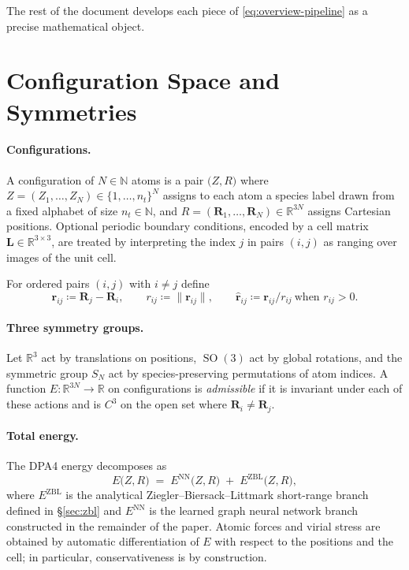 \documentclass[11pt,a4paper]{article}
\DeclareMathOperator{\SO}{SO}
\newcommand{\R}{\mathbb{R}}
\newcommand{\N}{\mathbb{N}}
\newcommand{\bR}{\bm{R}}
\newcommand{\br}{\bm{r}}
\newcommand{\brh}{\hat{\bm{r}}}
\theoremstyle{plain}
\theoremstyle{definition}
\theoremstyle{remark}
\begin{document}
The rest of the document develops each piece of \eqref{eq:overview-pipeline} as
a precise mathematical object.

\section{Configuration Space and Symmetries}\label{sec:setup}

\paragraph{Configurations.}
A configuration of $N\in\N$ atoms is a pair $\bigl(Z,R\bigr)$ where
$Z=(Z_1,\dots,Z_N)\in\{1,\dots,n_t\}^N$ assigns to each atom a species label
drawn from a fixed alphabet of size $n_t\in\N$, and
$R=(\bR_1,\dots,\bR_N)\in\R^{3N}$ assigns Cartesian positions. Optional
periodic boundary conditions, encoded by a cell matrix $\bm{L}\in\R^{3\times
        3}$, are treated by interpreting the index $j$ in pairs $(i,j)$ as ranging over
images of the unit cell.

For ordered pairs $(i,j)$ with $i\neq j$ define
\begin{equation}
    \br_{ij}\coloneqq \bR_j-\bR_i,\qquad
    r_{ij}\coloneqq \|\br_{ij}\|,\qquad
    \brh_{ij}\coloneqq \br_{ij}/r_{ij}\ \text{when }r_{ij}>0.
\end{equation}

\paragraph{Three symmetry groups.}
Let $\R^3$ act by translations on positions, $\SO(3)$ act by global rotations,
and the symmetric group $S_N$ act by species-preserving permutations of atom
indices. A function $E:\R^{3N}\to\R$ on configurations is \emph{admissible} if
it is invariant under each of these actions and is $C^3$ on the open set where
$\bR_i\neq\bR_j$.

\paragraph{Total energy.}
The DPA4 energy decomposes as
\begin{equation}\label{eq:totalE}
    E\bigl(Z,R\bigr) \;=\; E^{\mathrm{NN}}\bigl(Z,R\bigr) \;+\; E^{\mathrm{ZBL}}\bigl(Z,R\bigr),
\end{equation}
where $E^{\mathrm{ZBL}}$ is the analytical Ziegler--Biersack--Littmark short-range branch defined in \S\ref{sec:zbl} and $E^{\mathrm{NN}}$ is the learned graph neural network branch constructed in the remainder of the paper.
Atomic forces and virial stress are obtained by automatic differentiation of $E$ with respect to the positions and the cell;
in particular, conservativeness is by construction.
\end{document}
